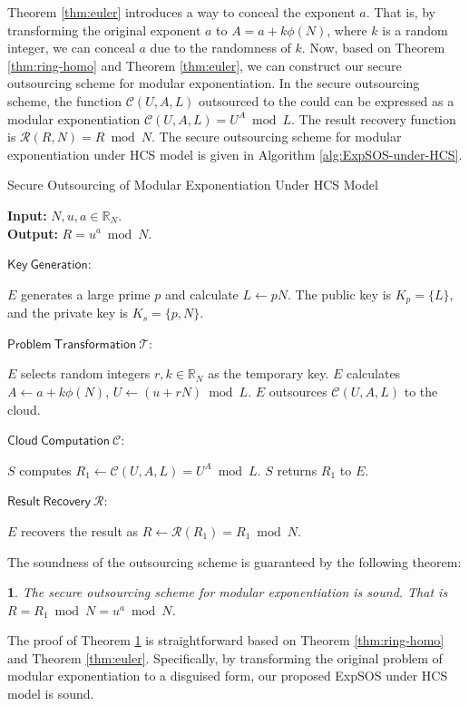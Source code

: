 \documentclass[english,draftcls,onecolumn,11pt]{IEEEtran}
\theoremstyle{definition}
\theoremstyle{plain}
\newtheorem{thm}{\protect\theoremname}
\theoremstyle{plain}
\theoremstyle{definition}
\providecommand{\theoremname}{Theorem}
\begin{document}
Theorem \ref{thm:euler} introduces a way to conceal the exponent
$a$. That is, by transforming the original exponent $a$ to $A=a+k\phi(N)$,
where $k$ is a random integer, we can conceal $a$ due to the randomness
of $k$. Now, based on Theorem \ref{thm:ring-homo} and Theorem \ref{thm:euler},
we can construct our secure outsourcing scheme for modular exponentiation.
In the secure outsourcing scheme, the function $\mathcal{C}(U,A,L)$
outsourced to the could can be expressed as a modular exponentiation
$\mathcal{C}(U,A,L)=U^{A}\bmod L$. The result recovery function is
$\mathcal{R}(R,N)=R\bmod N$. The secure outsourcing scheme for modular
exponentiation under HCS model is given in Algorithm \ref{alg:ExpSOS-under-HCS}. 

\begin{algorithm}[tbh] 
\caption{Secure Outsourcing of Modular Exponentiation Under HCS Model\label{alg:ExpSOS-under-HCS}}

\smallskip 
\textbf{Input:} $N,u,a\in\mathbb{R}_N$.\\
\textbf{Output:} $R=u^a\bmod N$.

\smallskip 
$\mathsf{Key\ Generation}$:
\begin{algorithmic}[1] 
\STATE $E$ generates a large prime $p$ and calculate $L\leftarrow pN$. 
\STATE The public key is $K_p=\{L\}$, and the private key is $K_s=\{p,N\}$.  
\end{algorithmic} 

\smallskip 
$\mathsf{Problem\ Transformation}\ \mathcal{T}$:  
\begin{algorithmic}[1] 
\STATE $E$ selects random integers $r,k\in\mathbb{R}_N$ as the temporary key.
\STATE $E$ calculates $A\leftarrow a+k\phi(N)$,
$U\leftarrow (u+rN)\bmod L$.
\STATE $E$ outsources $\mathcal{C}(U,A,L)$ to the cloud.
\end{algorithmic} 

\smallskip
$\mathsf{Cloud\ Computation}\ \mathcal{C}$:
\begin{algorithmic}[1] 
\STATE $S$ computes $R_1\leftarrow\mathcal{C}(U,A,L)=U^A\bmod L$. 
\STATE $S$ returns $R_1$ to $E$.
\end{algorithmic} 

\smallskip
$\mathsf{Result\ Recovery}\ \mathcal{R}$:
\begin{algorithmic}[1] 
\STATE $E$ recovers the result as $R\leftarrow \mathcal{R}(R_1)=R_1\bmod N$.
\end{algorithmic} 
\end{algorithm}

The soundness of the outsourcing scheme is guaranteed by the following
theorem:
\begin{thm}
\label{thm:correctness} The secure outsourcing scheme for modular
exponentiation is sound. That is $R=R_{1}\bmod N=u^{a}\bmod N$.
\end{thm}
The proof of Theorem \ref{thm:correctness} is straightforward based
on Theorem \ref{thm:ring-homo} and Theorem \ref{thm:euler}. Specifically,
by transforming the original problem of modular exponentiation to
a disguised form, our proposed ExpSOS under HCS model is sound. 
\end{document}
